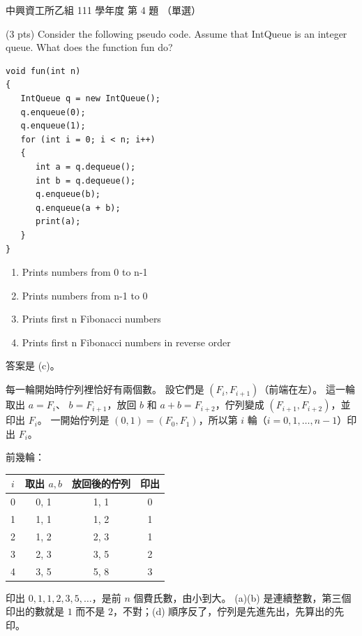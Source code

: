 \begin{pastexam}[label={px:nchu-111-is-04}]{中興資工所乙組 111 學年度 第 4 題}
（單選）

(3 pts) Consider the following pseudo code. Assume that IntQueue is an integer queue. What does the function
fun do?
\begin{verbatim}
void fun(int n)
{
   IntQueue q = new IntQueue();
   q.enqueue(0);
   q.enqueue(1);
   for (int i = 0; i < n; i++)
   {
      int a = q.dequeue();
      int b = q.dequeue();
      q.enqueue(b);
      q.enqueue(a + b);
      print(a);
   }
}
\end{verbatim}
\begin{enumerate}[label=(\alph*).]
\item Prints numbers from 0 to n-1
\item Prints numbers from n-1 to 0
\item Prints first n Fibonacci numbers
\item Prints first n Fibonacci numbers in reverse order
\end{enumerate}
\end{pastexam}

\begin{pastsoln}
答案是 (c)。

每一輪開始時佇列裡恰好有兩個數。 設它們是 $(F_i, F_{i+1})$（前端在左）。 這一輪取出 $a = F_i$、
$b = F_{i+1}$，放回 $b$ 和 $a + b = F_{i+2}$，佇列變成 $(F_{i+1}, F_{i+2})$，並印出 $F_i$。 一開始佇列是
$(0, 1) = (F_0, F_1)$，所以第 $i$ 輪（$i = 0, 1, \ldots, n - 1$）印出 $F_i$。

前幾輪：
\begin{center}
\small
\begin{tabular}{cccc}
\toprule
$i$ & 取出 $a, b$ & 放回後的佇列 & 印出 \\
\midrule
0 & 0, 1 & 1, 1 & 0 \\
1 & 1, 1 & 1, 2 & 1 \\
2 & 1, 2 & 2, 3 & 1 \\
3 & 2, 3 & 3, 5 & 2 \\
4 & 3, 5 & 5, 8 & 3 \\
\bottomrule
\end{tabular}
\end{center}
印出 $0, 1, 1, 2, 3, 5, \ldots$，是前 $n$ 個費氏數，由小到大。 (a)(b) 是連續整數，第三個印出的數就是
$1$ 而不是 $2$，不對；(d) 順序反了，佇列是先進先出，先算出的先印。
\end{pastsoln}
